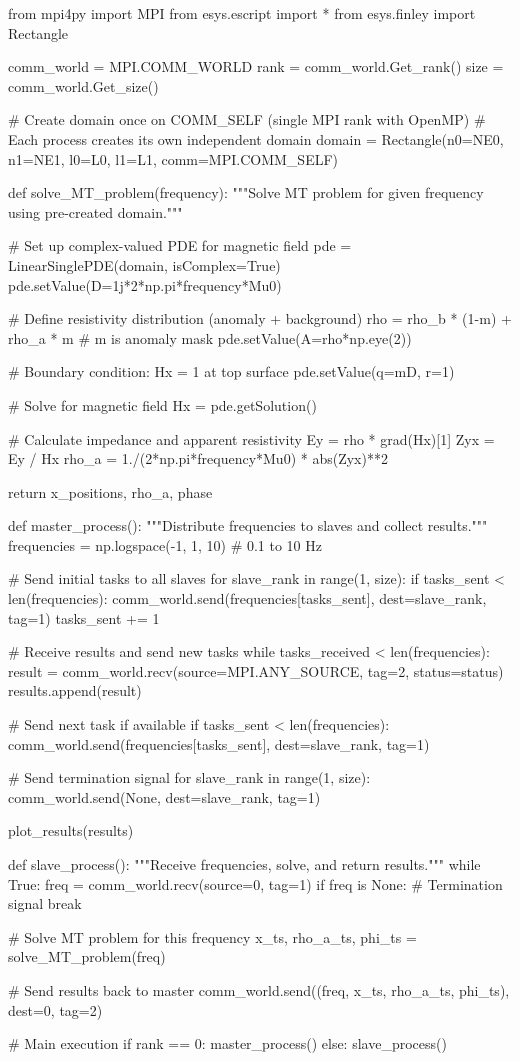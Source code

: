 \begin{python}
from mpi4py import MPI
from esys.escript import *
from esys.finley import Rectangle

comm_world = MPI.COMM_WORLD
rank = comm_world.Get_rank()
size = comm_world.Get_size()

# Create domain once on COMM_SELF (single MPI rank with OpenMP)
# Each process creates its own independent domain
domain = Rectangle(n0=NE0, n1=NE1, l0=L0, l1=L1, comm=MPI.COMM_SELF)

def solve_MT_problem(frequency):
    """Solve MT problem for given frequency using pre-created domain."""

    # Set up complex-valued PDE for magnetic field
    pde = LinearSinglePDE(domain, isComplex=True)
    pde.setValue(D=1j*2*np.pi*frequency*Mu0)

    # Define resistivity distribution (anomaly + background)
    rho = rho_b * (1-m) + rho_a * m  # m is anomaly mask
    pde.setValue(A=rho*np.eye(2))

    # Boundary condition: Hx = 1 at top surface
    pde.setValue(q=mD, r=1)

    # Solve for magnetic field
    Hx = pde.getSolution()

    # Calculate impedance and apparent resistivity
    Ey = rho * grad(Hx)[1]
    Zyx = Ey / Hx
    rho_a = 1./(2*np.pi*frequency*Mu0) * abs(Zyx)**2

    return x_positions, rho_a, phase

def master_process():
    """Distribute frequencies to slaves and collect results."""
    frequencies = np.logspace(-1, 1, 10)  # 0.1 to 10 Hz

    # Send initial tasks to all slaves
    for slave_rank in range(1, size):
        if tasks_sent < len(frequencies):
            comm_world.send(frequencies[tasks_sent], dest=slave_rank, tag=1)
            tasks_sent += 1

    # Receive results and send new tasks
    while tasks_received < len(frequencies):
        result = comm_world.recv(source=MPI.ANY_SOURCE, tag=2, status=status)
        results.append(result)

        # Send next task if available
        if tasks_sent < len(frequencies):
            comm_world.send(frequencies[tasks_sent], dest=slave_rank, tag=1)

    # Send termination signal
    for slave_rank in range(1, size):
        comm_world.send(None, dest=slave_rank, tag=1)

    plot_results(results)

def slave_process():
    """Receive frequencies, solve, and return results."""
    while True:
        freq = comm_world.recv(source=0, tag=1)
        if freq is None:  # Termination signal
            break

        # Solve MT problem for this frequency
        x_ts, rho_a_ts, phi_ts = solve_MT_problem(freq)

        # Send results back to master
        comm_world.send((freq, x_ts, rho_a_ts, phi_ts), dest=0, tag=2)

# Main execution
if rank == 0:
    master_process()
else:
    slave_process()
\end{python}

